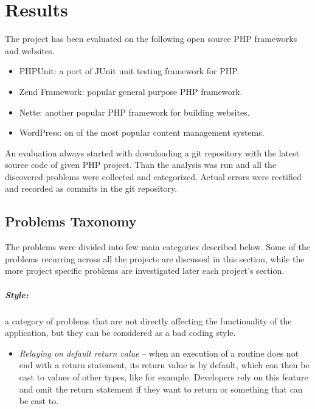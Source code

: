 \chapter{Results}

The project has been evaluated on the following open source PHP frameworks and 
websites.

\begin{itemize}
    \item PHPUnit: a port of JUnit unit testing framework for PHP. 
    \item Zend Framework: popular general purpose PHP framework.
    \item Nette: another popular PHP framework for building websites.
    \item WordPress: on of the most popular content management systems.
\end{itemize}

An evaluation always started with downloading a git repository with the 
latest source code of given PHP project. Than the analysis was run and 
all the discovered problems were collected and categorized.
Actual errors were rectified and recorded as commits in the 
git repository. 

\section{Problems Taxonomy}

The problems were divided into few main categories 
described below. Some of the problems recurring 
across all the projects are discussed in this section, 
while the more project specific problems are 
investigated later each project's section.

\paragraph*{Style:} a category of problems that 
are not directly affecting the functionality of the 
application, but they can be considered as a bad 
coding style. 

\begin{itemize}
    \item[] \textit{Relaying on default return value} -- when an execution of a 
        routine does not end with a return statement, its 
        return value is  by default, which can then 
        be cast to values of other types, like  
        for example. Developers rely on this feature and omit 
        the return statement if they want to return  or 
        something that  can be cast to.
\end{itemize}

